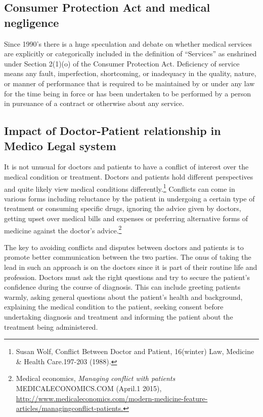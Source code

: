 \begin{multicols}{2}
\vspace{-.4cm}

\subsection*{Consumer Protection Act and medical negligence}

\vspace{-.2cm}

\noi
Since 1990’s there is a huge speculation and debate on whether medical services are
explicitly or categorically included in the definition of “Services” as enshrined under
Section 2(1)(o) of the Consumer Protection Act. Deficiency of service means any fault,
imperfection, shortcoming, or inadequacy in the quality, nature, or manner of
performance that is required to be maintained by or under any law for the time being in
force or has been undertaken to be performed by a person in pursuance of a contract or
otherwise about any service.

\vspace{-.4cm}

\subsection*{Impact of Doctor-Patient relationship in\\ Medico Legal system}

\vspace{-.2cm}

\noi
It is not unusual for doctors and patients to have a conflict of interest over the medical condition or treatment. Doctors and patients hold different perspectives and quite likely view medical conditions differently.\footnote{Susan Wolf, Conflict Between Doctor and Patient, 16(winter) Law, Medicine \& Health Care.197-203 (1988).} Conflicts can come in various forms including reluctance by the patient in undergoing a certain type of treatment or consuming specific drugs, ignoring the advice given by doctors, getting upset over medical bills and expenses or preferring alternative forms of medicine against the doctor’s advice.\footnote{Medical economics, \textit{Managing conflict with patients} MEDICALECONOMICS.COM (April.1 2015), \url{http://www.medicaleconomics.com/modern-medicine-feature-articles/managingconflict-patients.}}

\noi
The key to avoiding conflicts and disputes between doctors and patients is to promote
better communication between the two parties. The onus of taking the lead in such an
approach is on the doctors since it is part of their routine life and profession. Doctors
must ask the right questions and try to secure the patient’s confidence during the course
of diagnosis. This can include greeting patients warmly, asking general questions about
the patient’s health and background, explaining the medical condition to the patient,
seeking consent before undertaking diagnosis and treatment and informing the patient
about the treatment being administered.


\end{multicols}
